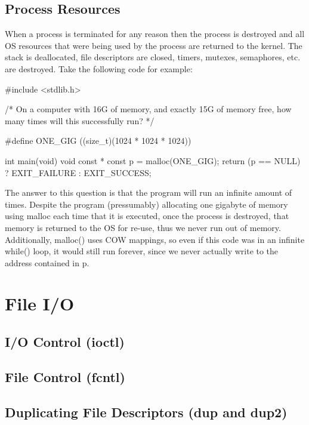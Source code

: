 \documentclass{article}
\begin{document}
\subsection{Process Resources}

When a process is terminated for any reason then the process is destroyed and all OS resources that were being
used by the process are returned to the kernel. The stack is deallocated, file descriptors are closed, timers,
mutexes, semaphores, etc. are destroyed. Take the following code for example:

\begin{clst}

#include <stdlib.h>

/*
    On a computer with 16G of memory, and exactly 15G of memory
    free, how many times will this successfully run?
*/

#define ONE_GIG ((size_t)(1024 * 1024 * 1024))

int main(void) {
    void const * const p = malloc(ONE_GIG);
    return (p == NULL) ? EXIT_FAILURE : EXIT_SUCCESS;
}

\end{clst}

The answer to this question is that the program will run an infinite amount of times. Despite the program
(pressumably) allocating one gigabyte of memory using malloc each time that it is executed, once the process
is destroyed, that memory is returned to the OS for re-use, thus we never run out of memory. Additionally,
malloc() uses COW mappings, so even if this code was in an infinite while() loop, it would still run forever,
since we never actually write to the address contained in p.

\section{File I/O}

\subsection{I/O Control (ioctl)}

\subsection{File Control (fcntl)}

\subsection{Duplicating File Descriptors (dup and dup2)}
\end{document}
